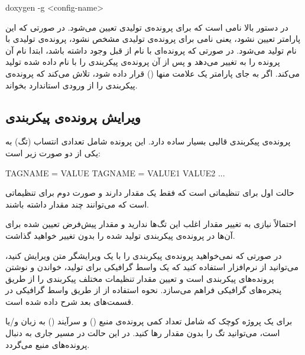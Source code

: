\begin{Shell}  
doxygen -g <config-name>
\end{Shell}

در دستور بالا  نامی است که برای پرونده‌ی تولیدی تعیین می‌شود.
در صورتی که این پارامتر تعیین نشود، یعنی نامی برای پرونده‌ی تولیدی مشخص نشود،
پرونده‌ی تولیدی با نام  تولید می‌شود.
در صورتی که پرونده‌ای با نام  از قبل وجود داشته باشد،
 ابتدا نام آن پرونده را به  تغییر می‌دهد و پس
از آن پرونده‌ی پیکربندی را با نام داده شده تولید می‌کند.
اگر به جای پارامتر  یک علامت منها (\-) قرار داده شود،
 تلاش می‌کند که پرونده‌ی پیکربندی را از ورودی استاندارد 
بخواند.

\subsection{ویرایش پرونده‌ی پیکربندی}

پرونده‌ی پیکربندی قالبی بسیار ساده دارد. این پرونده شامل تعدادی انتساب (تگ) به
یکی از دو صورت زیر است:

\begin{Config}
TAGNAME = VALUE
TAGNAME = VALUE1 VALUE2 ...
\end{Config}

حالت اول برای تنظیماتی است که فقط یک مقدار دارند و صورت دوم برای تنظیماتی است که
می‌توانند چند مقدار داشته باشند.

احتمالاً نیازی به تغییر مقدار اغلب این تگ‌ها ندارید و مقدار پیش‌فرض تعیین شده
برای آن‌ها در پرونده‌ی پیکربندی تولید شده را بدون تغییر خواهید گذاشت.

در صورتی که نمی‌خواهید پرونده‌ی پیکربندی را با یک ویرایشگر متن ویرایش کنید،
می‌توانید از نرم‌افزار  استفاده کنید که یک واسط گرافیکی برای
تولید، خواندن و نوشتن پرونده‌های پیکربندی است و تعیین مقدار تنظیمات مختلف
پیکربندی را از طریق پنجره‌های گرافیکی فراهم می‌سازد. نحوه استفاده از
 از طریق واسط گرافیکی  در قسمت‌های بعد شرح داده شده
است.

برای یک پروژه کوچک که شامل تعداد کمی پرونده‌ی منبع () و سرآیند
() به زبان  و/یا  است، می‌توانید تگ  را بدون
مقدار رها کنید. در این حالت  در مسیر جاری به دنبال پرونده‌های منبع
می‌گردد.

